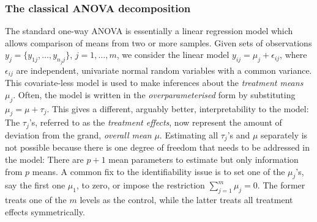 \subsubsection{The classical ANOVA decomposition}

The standard one-way ANOVA is essentially a linear regression model which allows comparison of means from two or more samples.
Given sets of observations $y_j = \{y_{1j},\dots,y_{n_jj}\}$, $j=1,\dots,m$, we consider the linear model $y_{ij} = \mu_j + \epsilon_{ij}$, where $\epsilon_{ij}$ are independent, univariate normal random variables with a common variance.
This covariate-less model is used to make inferences about the  \emph{treatment means} $\mu_j$.
Often, the model is written in the \emph{overparameterised} form by substituting $\mu_j = \mu + \tau_j$.
This gives a different, arguably better, interpretability to the model: The $\tau_j$'s, referred to as the \emph{treatment effects}, now represent the amount of deviation from the grand, \emph{overall mean} $\mu$.
Estimating all $\tau_j$'s and $\mu$ separately is not possible because there is one degree of freedom that needs to be addressed in the model: There are $p+1$ mean parameters to estimate but only information from $p$ means.
A common fix to the identifiability issue is to set one of the $\mu_j$'s, say the first one $\mu_1$, to zero, or impose the restriction $\sum_{j=1}^m \mu_j = 0$.
The former treats one of the $m$ levels as the control, while the latter treats all treatment effects symmetrically.


